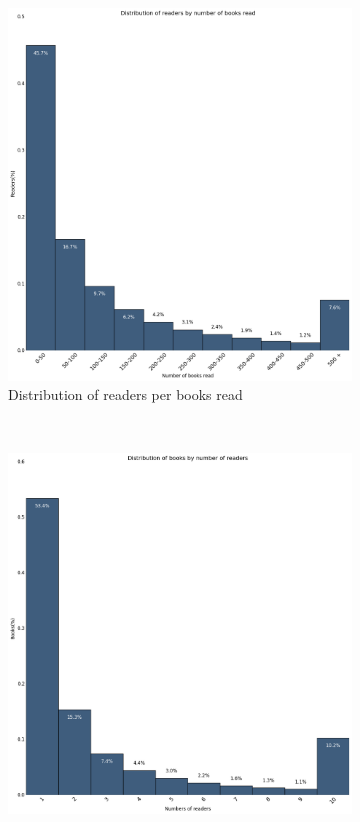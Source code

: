 \documentclass[11pt]{article}
\begin{document}
\begin{figure}
        \centering
        \begin{subfigure}[b]{0.5\textwidth}
                \includegraphics[width=\textwidth]{images/users}
                \caption{Distribution of readers per books read}
                \label{fig:readers_book_read}
        \end{subfigure}%
        ~ %
        \begin{subfigure}[b]{0.5\textwidth}
                \includegraphics[width=\textwidth]{images/books}

\end{subfigure}
\end{figure}
\end{document}
